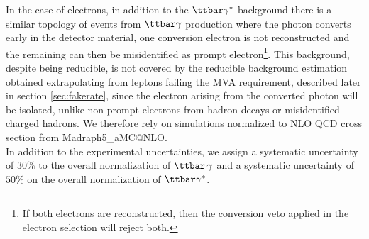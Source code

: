In the case of electrons, in addition to the $\ttbar\gamma^*$
background there is a similar topology of events from $\ttbar\gamma$
production where the photon converts early in the detector material,
one conversion electron is not reconstructed and the remaining can
then be misidentified as prompt electron\footnote{If both electrons
  are reconstructed, then the conversion veto applied in the electron
  selection will reject both.}. This background, despite being
reducible, is not covered by the reducible background estimation
obtained extrapolating from leptons failing the MVA requirement,
described later in section \ref{sec:fakerate}, since the electron
arising from the converted photon will be isolated, unlike non-prompt
electrons from hadron decays or misidentified charged hadrons. We
therefore rely on simulations normalized to NLO QCD cross section from Madraph5\_aMC@NLO.\\

In addition to the experimental uncertainties, we assign a systematic uncertainty of $30\%$ to the overall normalization of $\ttbar\,\gamma$ and a systematic uncertainty of $50\%$ on the overall normalization of $\ttbar\gamma^*$.
